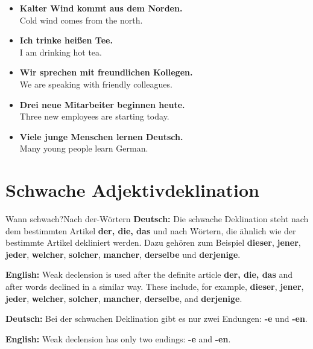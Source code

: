 \documentclass[a4paper,11pt]{article}
\newcommand{\GermanText}[1]{\textbf{Deutsch: }#1\par}
\newcommand{\EnglishText}[1]{{\small\color{SoftGray}\textbf{English: }#1\par}}
\newcommand{\ExampleItem}[2]{\item \textbf{#1}\\{\small\color{SoftGray}#2}}
\begin{document}
        \begin{exbox}
            \begin{itemize}
                \ExampleItem{Kalter Wind kommt aus dem Norden.}{Cold wind comes from the north.}
                \ExampleItem{Ich trinke heißen Tee.}{I am drinking hot tea.}
                \ExampleItem{Wir sprechen mit freundlichen Kollegen.}{We are speaking with friendly colleagues.}
                \ExampleItem{Drei neue Mitarbeiter beginnen heute.}{Three new employees are starting today.}
                \ExampleItem{Viele junge Menschen lernen Deutsch.}{Many young people learn German.}
            \end{itemize}
        \end{exbox}

    \section{Schwache Adjektivdeklination}

        \begin{grammarentry}{Wann schwach?}{Nach der-Wörtern}
            \GermanText{Die schwache Deklination steht nach dem bestimmten Artikel \textbf{der, die, das} und nach Wörtern, die ähnlich wie der bestimmte Artikel dekliniert werden. Dazu gehören zum Beispiel \textbf{dieser}, \textbf{jener}, \textbf{jeder}, \textbf{welcher}, \textbf{solcher}, \textbf{mancher}, \textbf{derselbe} und \textbf{derjenige}.}
            \EnglishText{Weak declension is used after the definite article \textbf{der, die, das} and after words declined in a similar way. These include, for example, \textbf{dieser}, \textbf{jener}, \textbf{jeder}, \textbf{welcher}, \textbf{solcher}, \textbf{mancher}, \textbf{derselbe}, and \textbf{derjenige}.}

            \GermanText{Bei der schwachen Deklination gibt es nur zwei Endungen: \textbf{-e} und \textbf{-en}.}
            \EnglishText{Weak declension has only two endings: \textbf{-e} and \textbf{-en}.}
        \end{grammarentry}
\end{document}
